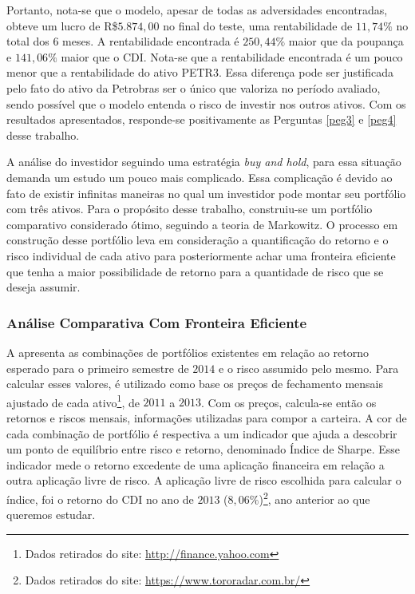 Portanto, nota-se que o modelo, apesar de todas as adversidades encontradas, obteve um lucro de R\$$5.874,00$ no final do teste, uma rentabilidade de $11,74\%$ no total dos 6 meses. A rentabilidade encontrada é $250,44\%$ maior que da poupança e $141,06\%$ maior que o \acrshort{CDI}. Nota-se que a rentabilidade encontrada é um pouco menor que a rentabilidade do ativo PETR3. Essa diferença pode ser justificada pelo fato do ativo da Petrobras ser o único que valoriza no período avaliado, sendo possível que o modelo entenda o risco de investir nos outros ativos. Com os resultados apresentados, responde-se positivamente as Perguntas \ref{peg3} e \ref{peg4} desse trabalho.

A análise do investidor seguindo uma estratégia \emph{buy and hold}, para essa situação demanda um estudo um pouco mais complicado. Essa complicação é devido ao fato de existir infinitas maneiras no qual um investidor pode montar seu portfólio com três ativos. Para o propósito desse trabalho, construiu-se um portfólio comparativo considerado ótimo, seguindo a teoria de Markowitz. O processo em construção desse portfólio leva em consideração a quantificação do retorno e o risco individual de cada ativo para posteriormente achar uma fronteira eficiente que tenha a maior possibilidade de retorno para a quantidade de risco que se deseja assumir.

\subsubsection{Análise Comparativa Com Fronteira Eficiente}

A  apresenta as combinações de portfólios existentes em relação ao retorno esperado para o primeiro semestre de $2014$ e o risco assumido pelo mesmo. Para calcular esses valores, é utilizado como base os preços de fechamento mensais ajustado de cada ativo\footnote{Dados retirados do site: \url{http://finance.yahoo.com}}, de $2011$ a $2013$. Com os preços, calcula-se então os retornos e riscos mensais, informações utilizadas para compor a carteira. A cor de cada combinação de portfólio é respectiva a um indicador que ajuda a descobrir um ponto de equilíbrio entre risco e retorno, denominado Índice de Sharpe. Esse indicador mede o retorno excedente de uma aplicação financeira em relação a outra aplicação livre de risco. A aplicação livre de risco escolhida para calcular o índice, foi o retorno do \acrshort{CDI} no ano de $2013$ ($8,06\%$)\footnote{Dados retirados do site: \url{https://www.tororadar.com.br/}}, ano anterior ao que queremos estudar. 

